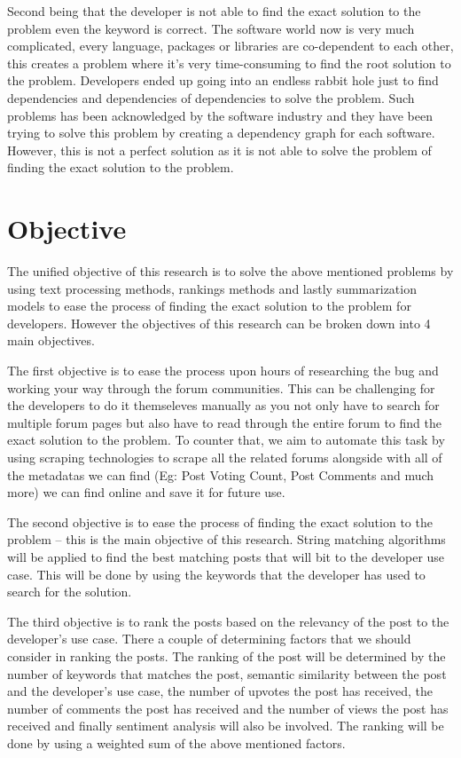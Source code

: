 Second being that the developer is not able to find the exact solution to the problem even the keyword is correct. The software world now is very much complicated, every language, packages or libraries are co-dependent to each other, this creates a problem where it's very time-consuming to find the root solution to the problem. Developers ended up going into an endless rabbit hole just to find dependencies and dependencies of dependencies to solve the problem. Such problems has been acknowledged by the software industry and they have been trying to solve this problem by creating a dependency graph for each software. However, this is not a perfect solution as it is not able to solve the problem of finding the exact solution to the problem.


\pagebreak
\section{Objective}
The unified objective of this research is to solve the above mentioned problems by using text processing methods, rankings methods and lastly summarization models to ease the process of finding the exact solution to the problem for developers. However the objectives of this research can be broken down into 4 main objectives. 

The first objective is to ease the process upon hours of researching the bug and working your way through the forum communities. This can be challenging for the developers to do it themseleves manually as you not only have to search for multiple forum pages but also have to read through the entire forum to find the exact solution to the problem. To counter that, we aim to automate this task by using scraping technologies to scrape all the related forums alongside with all of the metadatas we can find (Eg: Post Voting Count, Post Comments and much more) we can find online and save it for future use.

The second objective is to ease the process of finding the exact solution to the problem -- this is the main objective of this research. String matching algorithms will be applied to find the best matching posts that will bit to the developer use case. This will be done by using the keywords that the developer has used to search for the solution.

The third objective is to rank the posts based on the relevancy of the post to the developer's use case. There a couple of determining factors that we should consider in ranking the posts. The ranking of the post will be determined by the number of keywords that matches the post, semantic similarity between the post and the developer's use case, the number of upvotes the post has received, the number of comments the post has received and the number of views the post has received and finally sentiment analysis will also be involved. The ranking will be done by using a weighted sum of the above mentioned factors.

